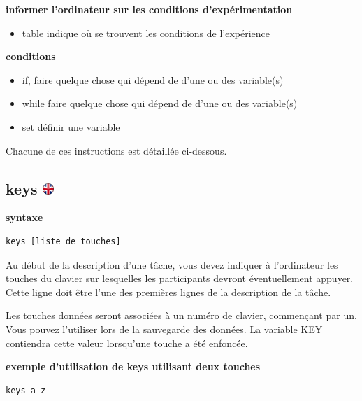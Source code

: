 \documentclass[
]{book}
\providecommand{\tightlist}{%
  \setlength{\itemsep}{0pt}\setlength{\parskip}{0pt}}
\begin{document}
\textbf{informer l'ordinateur sur les conditions d'expérimentation}

\begin{itemize}
\tightlist
\item
  \protect\hyperlink{task-table}{table} indique où se trouvent les
  conditions de l'expérience
\end{itemize}

\textbf{conditions}

\begin{itemize}
\tightlist
\item
  \protect\hyperlink{task-if}{if}, faire quelque chose qui dépend de
  d'une ou des variable(s)
\item
  \protect\hyperlink{task-while}{while} faire quelque chose qui dépend
  de d'une ou des variable(s)
\item
  \protect\hyperlink{task-set}{set} définir une variable
\end{itemize}

Chacune de ces instructions est détaillée ci-dessous.

\hypertarget{keys}{%
\subsection[keys ]{\texorpdfstring{keys
\href{https://www.psytoolkit.org/doc3.2.0/syntax.html\#task-keys}{\protect\includegraphics{img/ukflag.png}}}{keys }}\label{keys}}

\textbf{syntaxe}

\begin{verbatim}
keys [liste de touches]
\end{verbatim}

Au début de la description d'une tâche, vous devez indiquer à
l'ordinateur les touches du clavier sur lesquelles les participants
devront éventuellement appuyer. Cette ligne doit être l'une des
premières lignes de la description de la tâche.

Les touches données seront associées à un numéro de clavier, commençant
par un. Vous pouvez l'utiliser lors de la sauvegarde des données. La
variable KEY contiendra cette valeur lorsqu'une touche a été enfoncée.

\textbf{exemple d'utilisation de keys utilisant deux touches}

\begin{verbatim}
keys a z
\end{verbatim}
\end{document}
